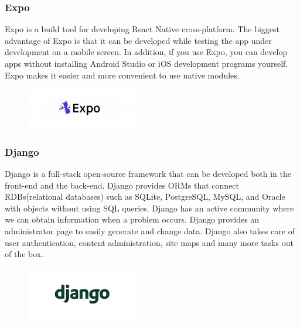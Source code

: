 \documentclass[conference]{IEEEtran}
\begin{document}
\subsubsection{Expo}
Expo is a build tool for developing React Native cross-platform. The biggest advantage of Expo is that it can be developed while testing the app under development on a mobile screen. In addition, if you use Expo, you can develop apps without installing Android Studio or iOS development programs yourself. Expo makes it easier and more convenient to use native modules.

\begin{figure}[h!]
\centering
\includegraphics[width=5cm]{imagefolder/expo.png}
\caption{}
\label{fig:map}
\end{figure}

\subsubsection{Django}
Django is a full-stack open-source framework that can be developed both in the front-end and the back-end. Django provides ORMs that connect RDBs(relational databases) such as SQLite, PostgreSQL, MySQL, and Oracle with objects without using SQL queries.  Django has an active community where we can obtain information when a problem occurs. Django provides an administrator page to easily generate and change data. Django also takes care of user authentication, content administration, site maps and many more tasks out of the box. \\

\begin{figure}[h!]
\centering
\includegraphics[width=5cm]{imagefolder/django.png}
\caption{}
\label{fig:map}
\end{figure}
\end{document}
